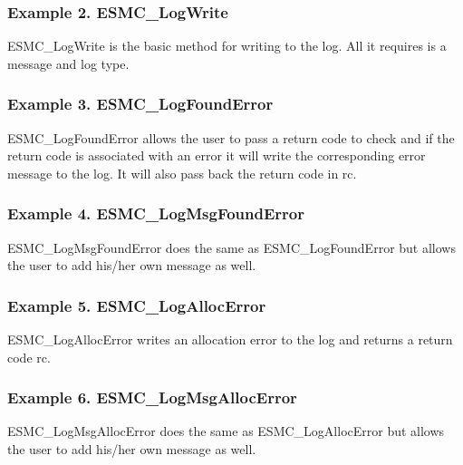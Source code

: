 \subsubsection{Example 2. ESMC\_LogWrite}

ESMC\_LogWrite is the basic method for writing to the log.  All it requires is a
message and log type.

\subsubsection{Example 3. ESMC\_LogFoundError}

ESMC\_LogFoundError allows the user to pass a return code to check and if the 
return code is associated with an error it will write the corresponding error
message to the log.  It will also pass back the return code in rc.

\subsubsection{Example 4. ESMC\_LogMsgFoundError}

ESMC\_LogMsgFoundError does the same as ESMC\_LogFoundError but allows the user
to add his/her own message as well.

\subsubsection{Example 5. ESMC\_LogAllocError}

ESMC\_LogAllocError writes an allocation error to the log and returns a return
code rc.

\subsubsection{Example 6. ESMC\_LogMsgAllocError}

ESMC\_LogMsgAllocError does the same as ESMC\_LogAllocError but allows the user
to add his/her own message as well.

